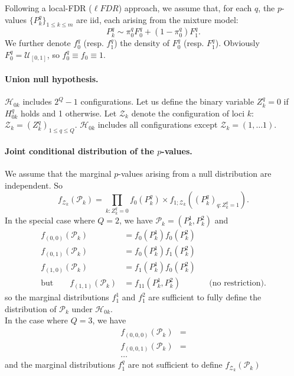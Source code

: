 \documentclass[a4paper, 11pt]{article}
\newcommand{\Hcal}{\mathcal{H}}
\newcommand{\Pcal}{\mathcal{P}}
\newcommand{\Ucal}{\mathcal{U}}
\newcommand{\Zcal}{\mathcal{Z}}
\begin{document}
Following a local-FDR ($\ell FDR$) approach, we assume that, for each $q$, the $p$-values $\{P^q_k\}_{1 \leq k \leq m}$ are iid, each arising from the mixture model:
\begin{equation} \label{eq:MixturePk}
 P^q_k \sim \pi_0^q F^q_0 + (1-\pi_0^q) F^q_1.
\end{equation}
We further denote $f^q_0$ (resp. $f^q_1$) the density of $F^q_0$ (resp. $F^q_1$). Obviously $F^q_0 = \Ucal_{[0, 1]}$, so $f^q_0 \equiv f_0 \equiv 1$.

\paragraph{Union null hypothesis.} 
$\Hcal_{0k}$ includes $2^Q -1$ configurations. Let us define the binary variable
$Z^q_k = 0$ if $H^q_{0k}$ holds and 1 otherwise. Let $\Zcal_k$ denote the configuration of loci $k$: $\Zcal_k = (Z^q_k)_{1 \leq q \leq Q}$. $\Hcal_{0k}$ includes all configurations except $\Zcal_k = (1, \dots 1)$.

\paragraph{Joint conditional distribution of the $p$-values.} We assume that the marginal $p$-values arising from a null distribution are independent. So
$$
f_{\Zcal_k}(\Pcal_k) = \prod_{k: Z^q_k=0} f_0(P^q_k) \times f_{1;\Zcal_k}\left((P^q_k)_{q: Z^q_k=1}\right).
$$
In the special case where $Q=2$, we have $\Pcal_k = (P^1_k, P^2_k)$ and
\begin{align*}
  f_{(0,0)}(\Pcal_k) & = f_0(P^1_k) f_0(P^2_k) \\
  f_{(0,1)}(\Pcal_k) & = f_0(P^1_k) f_1(P^2_k) \\
  f_{(1,0)}(\Pcal_k) & = f_1(P^1_k) f_0(P^2_k) \\
  \text{but} \qquad f_{(1,1)}(\Pcal_k) & = f_{11}(P^1_k, P^2_k) & & \text{(no restriction).}
\end{align*} 
so the marginal distributions $f^1_1$ and $f^2_1$ are sufficient to fully define the distribution of $\Pcal_k$ under $\Hcal_{0k}$. \\
In the case where $Q=3$, we have
\begin{align*}
  f_{(0,0,0)}(\Pcal_k) & = \\
  f_{(0,0,1)}(\Pcal_k) & = \\
  \dots 
\end{align*}
and the marginal distributions $f^q_1$ are not sufficient to define $f_{\Zcal_k}(\Pcal_k)$
\end{document}
